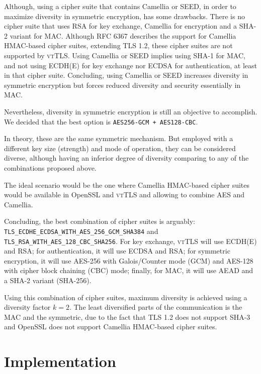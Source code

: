 \documentclass{sig-alternate-05-2015}
\newcommand{\suite}[1]{\texttt{{\footnotesize #1}}}
\begin{document}
Although, using a cipher suite that contains Camellia or SEED, in order to maximize diversity in symmetric encryption, has some drawbacks.
There is no cipher suite that uses RSA for key exchange, Camellia for encryption and a SHA-2 variant for MAC. Although RFC 6367 \cite{RFC6367} describes the support for Camellia HMAC-based cipher suites, extending TLS 1.2, these cipher suites are not supported by \textsc{vtTLS}.
Using Camellia or SEED implies using SHA-1 for MAC, and not using ECDH(E) for key exchange nor ECDSA for authentication, at least in that cipher suite.
Concluding, using Camellia or SEED increases diversity in symmetric encryption but forces reduced diversity and security essentially in MAC.

Nevertheless, diversity in symmetric encryption is still an objective to accomplish. We decided that the best option is \suite{AES256-GCM + AES128-CBC}.

In theory, these are the same symmetric mechanism. But employed with a different key size (strength) and mode of operation, they can be considered diverse, although  having an inferior degree of diversity comparing to any of the combinations  proposed above.

The ideal scenario would be the one where Camellia HMAC-based cipher suites would be available in OpenSSL and \textsc{vtTLS} and allowing to combine AES and Camellia.  


Concluding, the best combination of cipher suites is arguably:
\suite{TLS\_ECDHE\_ECDSA\_WITH\_AES\_256\_GCM\_SHA384} and \suite{TLS\_RSA\_WITH\_AES\_128\_CBC\_SHA256}.
For key exchange,  \textsc{vtTLS} will use ECDH(E) and RSA; for authentication, it will use ECDSA and RSA; for symmetric encryption, it will use AES-256 with Galois/Counter mode (GCM) and AES-128 with cipher block chaining (CBC) mode; finally, for MAC, it will use AEAD and a SHA-2 variant (SHA-256).

Using this combination of cipher suites, maximum diversity is achieved using a diversity factor $k = 2$. The least diversified parts of the communication is the MAC and the symmetric, due to the fact that TLS 1.2 does not support SHA-3 and OpenSSL does not support Camellia HMAC-based cipher suites.


\section{Implementation}
\label{sec-implementation}
\end{document}
